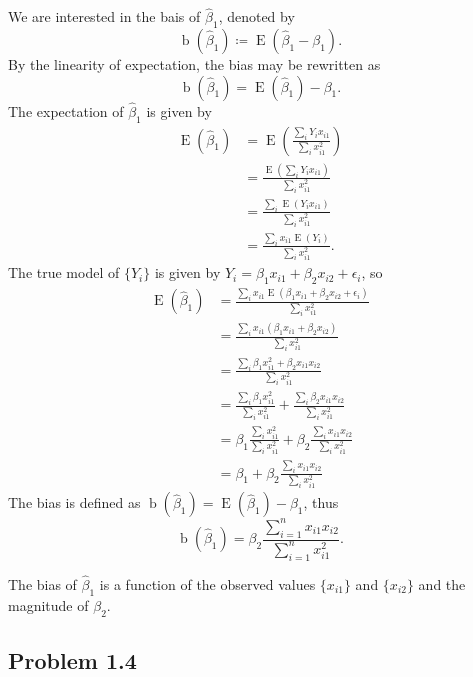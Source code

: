 \documentclass[
]{article}
\begin{document}
We are interested in the bais of \(\hat\beta_1\), denoted by \[
   \operatorname{b}(\hat\beta_1) \coloneqq \operatorname{E}(\hat\beta_1 - \beta_1).
\] By the linearity of expectation, the bias may be rewritten as \[
   \operatorname{b}(\hat\beta_1) = \operatorname{E}(\hat\beta_1) - \beta_1.
\] The expectation of \(\hat\beta_1\) is given by \begin{align*}
   \operatorname{E}(\hat\beta_1)
      &= \operatorname{E}\left(\frac{\sum_i Y_i x_{i 1}}{\sum_i x_{i 1}^2}\right)\\
      &= \frac{\operatorname{E}\left(\sum_i Y_i x_{i 1}\right)}{\sum_i x_{i 1}^2}\\
      &= \frac{\sum_i \operatorname{E}(Y_i x_{i 1})}{\sum_i x_{i 1}^2}\\
      &= \frac{\sum_i x_{i 1} \operatorname{E}(Y_i) }{\sum_i x_{i 1}^2}.
\end{align*} The true model of \(\{Y_i\}\) is given by
\(Y_i = \beta_1 x_{i 1} + \beta_2 x_{i 2} + \epsilon_i\), so
\begin{align*}
   \operatorname{E}(\hat\beta_1)
      &= \frac{\sum_i x_{i 1} \operatorname{E}(\beta_1 x_{i 1} + \beta_2 x_{i 2} + \epsilon_i)}{\sum_i x_{i 1}^2}\\
      &= \frac{\sum_i x_{i 1} (\beta_1 x_{i 1} + \beta_2 x_{i 2})}{\sum_i x_{i 1}^2}\\
      &= \frac{\sum_i \beta_1 x_{i 1}^2 + \beta_2 x_{i 1} x_{i 2}}{\sum_i x_{i 1}^2}\\
      &= \frac{\sum_i \beta_1 x_{i 1}^2}{\sum_i x_{i 1}^2} + \frac{\sum_i \beta_2 x_{i 1} x_{i 2}}{\sum_i x_{i 1}^2}\\
      &= \beta_1 \frac{\sum_i x_{i 1}^2}{\sum_i x_{i 1}^2} + \beta_2 \frac{\sum_i x_{i 1} x_{i 2}}{\sum_i x_{i 1}^2}\\
      &= \beta_1 + \beta_2 \frac{\sum_i x_{i 1} x_{i 2}}{\sum_i x_{i 1}^2}
\end{align*} The bias is defined as
\(\operatorname{b}(\hat\beta_1) = \operatorname{E}(\hat\beta_1) - \beta_1\),
thus \[
   \operatorname{b}(\hat\beta_1) = \beta_2 \frac{\sum_{i=1}^n x_{i 1} x_{i 2}}{\sum_{i=1}^n x_{i 1}^2}.
\]

The bias of \(\hat\beta_1\) is a function of the observed values
\(\{x_{i 1}\}\) and \(\{x_{i 2}\}\) and the magnitude of \(\beta_2\).

\hypertarget{problem-1.4}{%
\subsection{Problem 1.4}\label{problem-1.4}}
\end{document}
